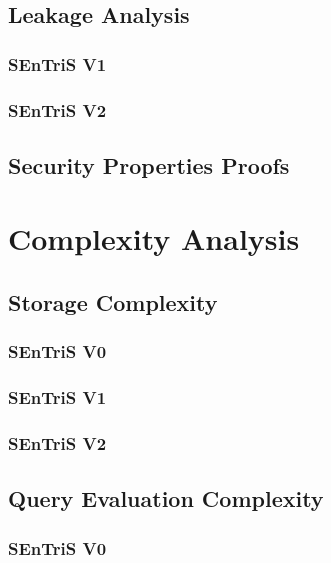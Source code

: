 
\subsection{Leakage Analysis}
\subsubsection{SEnTriS V1}
\subsubsection{SEnTriS V2}
\subsection{Security Properties Proofs}



\section{Complexity Analysis}

\subsection{Storage Complexity}
\subsubsection{SEnTriS V0}
\subsubsection{SEnTriS V1}
\subsubsection{SEnTriS V2}

\subsection{Query Evaluation Complexity}
\subsubsection{SEnTriS V0}
